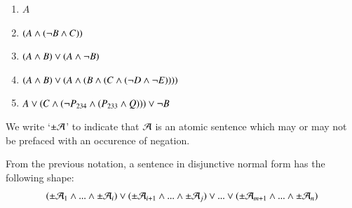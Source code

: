 \documentclass[12pt, a4paper, oneside, openright, titlepage]{book}
\begin{document}
\begin{eg}
    \leavevmode
    \begin{enumerate}
        \item $A$
        \item $(A\wedge (\neg B\wedge C))$
        \item $(A\wedge B)\vee (A\wedge \neg B)$
        \item $(A\wedge B)\vee(A\wedge (B\wedge(C\wedge(\neg D\wedge\neg E))))$
        \item $A\vee (C\wedge(\neg P_{234}\wedge (P_{233}\wedge Q)))\vee \neg B$
    \end{enumerate}
\end{eg}

\begin{nota}
    We write `$\pm\mathcal{A}$' to indicate that $\mathcal{A}$ is an atomic sentence which may or may not be prefaced with an occurence of negation. 
\end{nota}

\begin{rmk}
    From the previous notation, a sentence in disjunctive normal form has the following shape: \begin{equation*}
        (\pm\mathcal{A}_1\wedge ...\wedge\pm\mathcal{A}_i)\vee(\pm\mathcal{A}_{i+1}\wedge ...\wedge\pm\mathcal{A}_j)\vee...\vee(\pm\mathcal{A}_{m+1}\wedge ...\wedge\pm\mathcal{A}_n)
    \end{equation*}
\end{rmk}
\end{document}
